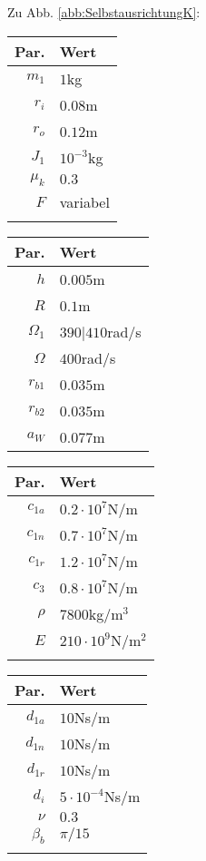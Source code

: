 Zu Abb. \ref{abb:SelbstausrichtungK}: 
\begin{center}
	\begin{tabular}{r|l}
		Par.&Wert\\\hline
		$m_1$&$1$kg\\
		$r_i$&$0.08$m\\
		$r_o$&$0.12$m\\
		$J_1$&$10^{-3}$kg\\
		$\mu_k$& $0.3$\\
		$F$&variabel\\
		&
	\end{tabular}\hfill
	\begin{tabular}{r|l}
		Par.&Wert\\\hline
		$h$&$0.005$m\\
		$R$&$0.1$m\\
		$\Omega_1$&$390|410$rad/s\\
		$\Omega$& $400$rad/s \\
		$r_{b1}$&$0.035$m\\
		$r_{b2}$&$0.035$m\\
		$a_{W}$&$0.077$m\\
	\end{tabular}\hfill
	\begin{tabular}{r|l}
		Par.&Wert\\\hline
		$c_{1a}$&$0.2\cdot10^{7}$N/m\\
		$c_{1n}$&$0.7\cdot10^{7}$N/m\\
		$c_{1r}$&$1.2\cdot10^{7}$N/m\\
		$c_{3}$&$0.8\cdot10^{7}$N/m\\
		$\rho$&$7800$kg/m$^3$\\
		$E$&$210\cdot10^9$N/m$^2$\\
		&
	\end{tabular}\hfill
	\begin{tabular}{r|l}
		Par.&Wert\\\hline
		$d_{1a}$&$10$Ns/m\\
		$d_{1n}$&$10$Ns/m\\
		$d_{1r}$&$10$Ns/m\\
		$d_i$ &$5\cdot10^{-4}$Ns/m\\
		$\nu$&$0.3$\\
		$\beta_b$&$\pi/15$\\
		&
	\end{tabular}
\end{center}

